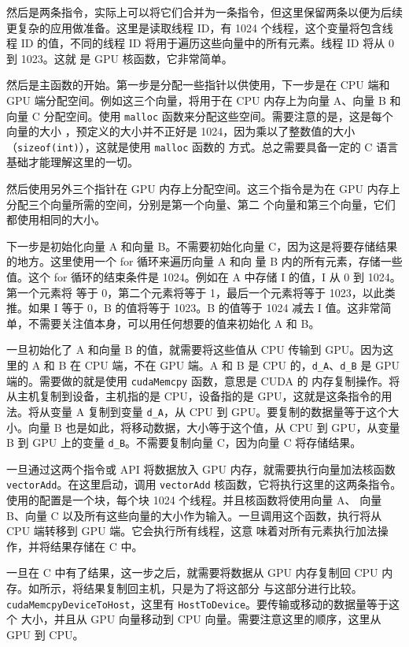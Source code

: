 然后是两条指令，实际上可以将它们合并为一条指令，但这里保留两条以便为后续更复杂的应用做准备。这里是读取线程 ID，有 
1024 个线程，这个变量将包含线程 ID 的值，不同的线程 ID 将用于遍历这些向量中的所有元素。线程 ID 将从 0 到 1023。这就
是 GPU 核函数，它非常简单。

然后是主函数的开始。第一步是分配一些指针以供使用，下一步是在 CPU 端和 GPU 端分配空间。例如这三个向量，将用于在 CPU 
内存上为向量 A、向量 B 和向量 C 分配空间。使用 \texttt{malloc} 函数来分配这些空间。需要注意的是，这是每个向量的大小
，预定义的大小并不正好是 1024，因为乘以了整数值的大小（\texttt{sizeof(int)}），这就是使用 \texttt{malloc} 函数的
方式。总之需要具备一定的 C 语言基础才能理解这里的一切。

然后使用另外三个指针在 GPU 内存上分配空间。这三个指令是为在 GPU 内存上分配三个向量所需的空间，分别是第一个向量、第二
个向量和第三个向量，它们都使用相同的大小。

下一步是初始化向量 A 和向量 B。不需要初始化向量 C，因为这是将要存储结果的地方。这里使用一个 for 循环来遍历向量 A 和向
量 B 内的所有元素，存储一些值。这个 for 循环的结束条件是 1024。例如在 A 中存储 I 的值，I 从 0 到 1024。第一个元素将
等于 0，第二个元素将等于 1，最后一个元素将等于 1023，以此类推。如果 I 等于 0，B 的值将等于 1023。B 的值等于 1024 
减去 I 值。这非常简单，不需要关注值本身，可以用任何想要的值来初始化 A 和 B。

一旦初始化了 A 和向量 B 的值，就需要将这些值从 CPU 传输到 GPU。因为这里的 A 和 B 在 CPU 端，不在 GPU 端。A 和 B 
是 CPU 的，\texttt{d\_A}、\texttt{d\_B} 是 GPU 端的。需要做的就是使用 \texttt{cudaMemcpy} 函数，意思是 CUDA 的
内存复制操作。将从主机复制到设备，主机指的是 CPU，设备指的是 GPU，这就是这条指令的用法。将从变量 A 复制到变量 
\texttt{d\_A}，从 CPU 到 GPU。要复制的数据量等于这个大小。向量 B 也是如此，将移动数据，大小等于这个值，从 CPU 到 
GPU，从变量 B 到 GPU 上的变量 \texttt{d\_B}。不需要复制向量 C，因为向量 C 将存储结果。

一旦通过这两个指令或 API 将数据放入 GPU 内存，就需要执行向量加法核函数 \texttt{vectorAdd}。在这里启动，调用 
\texttt{vectorAdd} 核函数，它将执行这里的这两条指令。使用的配置是一个块，每个块 1024 个线程。并且核函数将使用向量 A、
向量 B、向量 C 以及所有这些向量的大小作为输入。一旦调用这个函数，执行将从 CPU 端转移到 GPU 端。它会执行所有线程，这意
味着对所有元素执行加法操作，并将结果存储在 C 中。

一旦在 C 中有了结果，这一步之后，就需要将数据从 GPU 内存复制回 CPU 内存。如所示，将结果复制回主机，只是为了将这部分
与这部分进行比较。\texttt{cudaMemcpyDeviceToHost}，这里有 \texttt{HostToDevice}。要传输或移动的数据量等于这个
大小，并且从 GPU 向量移动到 CPU 向量。需要注意这里的顺序，这里从 GPU 到 CPU。

